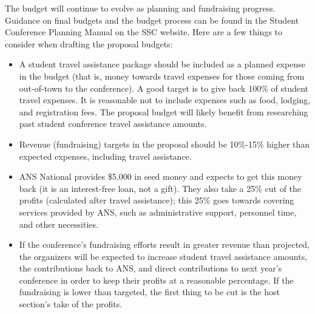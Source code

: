 \documentclass[12pt]{article}
\begin{document}
The budget will continue to evolve as planning and fundraising progress. Guidance on
final budgets and the budget process can be found in the Student Conference Planning Manual on
the SSC website. Here are a few things to consider when drafting the proposal budgets:

\begin{itemize}
\item{A student travel assistance package should be included as a planned expense in
the budget (that is, money towards travel expenses for those coming from out-of-town to the conference). 
A good target is to give back 100\% of student travel expenses. It is reasonable not to include expenses such as food, lodging, and registration fees.}
The proposal budget will likely benefit from researching past student conference travel assistance amounts.
\item{Revenue (fundraising) targets in the proposal should be 10\%-15\% higher than
expected expenses, including travel assistance.}
\item{ANS National provides \$5,000 in seed money and expects to get this money back (it is an interest-free loan, not a gift)}. They also take a 25\% cut of the
profits (calculated after travel assistance); this 25\% goes towards covering services provided by ANS, such as administrative support, personnel time, and other necessities.
\item{If the conference's fundraising efforts result in greater revenue than projected, the organizers will be
expected to increase student travel assistance amounts, the contributions back to ANS,
and direct contributions to next year’s conference in order to keep their profits at a
reasonable percentage. If the fundraising is lower than targeted, the first thing to
be cut is the host section’s take of the profits.}
\end{itemize}
\end{document}
